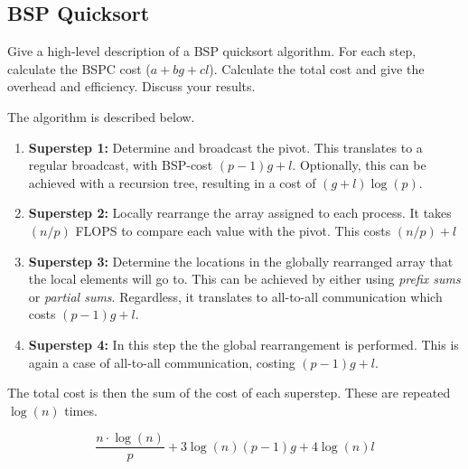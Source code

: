 \documentclass[../main.tex]{subfiles}
\begin{document}
\subsection{BSP Quicksort}
\label{q:qsort1}
\begin{question}
Give a high-level description of a BSP quicksort algorithm. For each step, calculate the BSPC cost ($a + bg + cl$).
Calculate the total cost and give the overhead and efficiency. Discuss your results.
\end{question}
\begin{solution} The algorithm is described below.

\begin{enumerate}
	\item \textbf{Superstep 1:} Determine and broadcast the pivot. This translates to a regular broadcast, with BSP-cost $(p-1)g + l$. Optionally, this can be achieved with a recursion tree, resulting in a cost of $(g+l) \log (p)$.
	\item \textbf{Superstep 2:} Locally rearrange the array assigned to each process. It takes $(n/p)$ FLOPS to compare each value with the pivot. This costs $(n/p) + l$
	\item \textbf{Superstep 3:} Determine the locations in the globally rearranged array that the local elements will go to. This can be achieved by either using \emph{prefix sums} or \emph{partial sums}. Regardless, it translates to all-to-all communication which costs $(p-1)g + l$.
	\item \textbf{Superstep 4:} In this step the the global rearrangement is performed. This is again a case of all-to-all communication, costing $(p-1)g + l$.
\end{enumerate}

The total cost is then the sum of the cost of each superstep. These are repeated $\log(n)$ times.

\begin{equation}
\frac{n \cdot \log(n)}{p} + 3\log(n)(p-1)g + 4\log(n)l
\end{equation}

\end{solution}
\end{document}
